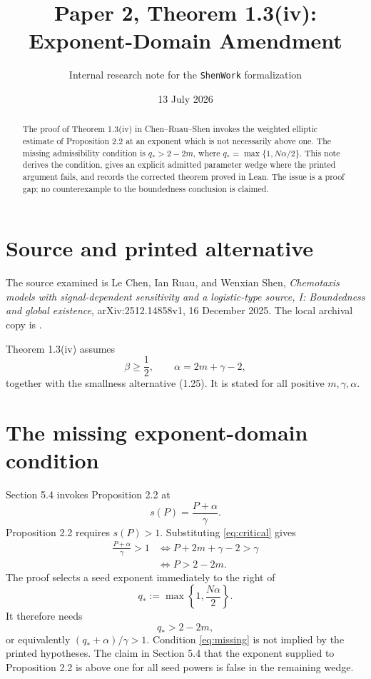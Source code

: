 \documentclass[11pt]{article}
\title{Paper 2, Theorem 1.3(iv): Exponent-Domain Amendment}
\author{Internal research note for the \texttt{ShenWork} formalization}
\date{13 July 2026}
\begin{document}
\maketitle

\begin{abstract}
The proof of Theorem 1.3(iv) in Chen--Ruau--Shen invokes the weighted elliptic
estimate of Proposition 2.2 at an exponent which is not necessarily above
one.  The missing admissibility condition is
\(q_* > 2-2m\), where \(q_*=\max\{1,N\alpha/2\}\).  This note derives the
condition, gives an explicit admitted parameter wedge where the printed
argument fails, and records the corrected theorem proved in Lean.  The issue
is a proof gap; no counterexample to the boundedness conclusion is claimed.
\end{abstract}

\section{Source and printed alternative}

The source examined is Le Chen, Ian Ruau, and Wenxian Shen,
\emph{Chemotaxis models with signal-dependent sensitivity and a logistic-type
source, I: Boundedness and global existence}, arXiv:2512.14858v1, 16 December
2025.  The local archival copy is .

Theorem 1.3(iv) assumes
\begin{equation}
  \beta\geq\frac12,
  \qquad
  \alpha=2m+\gamma-2,
  \label{eq:critical}
\end{equation}
together with the smallness alternative (1.25).  It is stated for all
positive \(m,\gamma,\alpha\).

\section{The missing exponent-domain condition}

Section 5.4 invokes Proposition 2.2 at
\begin{equation}
  s(P)=\frac{P+\alpha}{\gamma}.
  \label{eq:sP}
\end{equation}
Proposition 2.2 requires \(s(P)>1\).  Substituting
\eqref{eq:critical} gives
\begin{align*}
  \frac{P+\alpha}{\gamma}>1
  &\iff P+2m+\gamma-2>\gamma\\
  &\iff P>2-2m.
\end{align*}
The proof selects a seed exponent immediately to the right of
\begin{equation}
  q_*:=\max\left\{1,\frac{N\alpha}{2}\right\}.
\end{equation}
It therefore needs
\begin{equation}
  \boxed{q_*>2-2m,}
  \label{eq:missing}
\end{equation}
or equivalently \((q_*+\alpha)/\gamma>1\).  Condition
\eqref{eq:missing} is not implied by the printed hypotheses.  The claim in
Section 5.4 that the exponent supplied to Proposition 2.2 is above one for
all seed powers is false in the remaining wedge.
\end{document}
